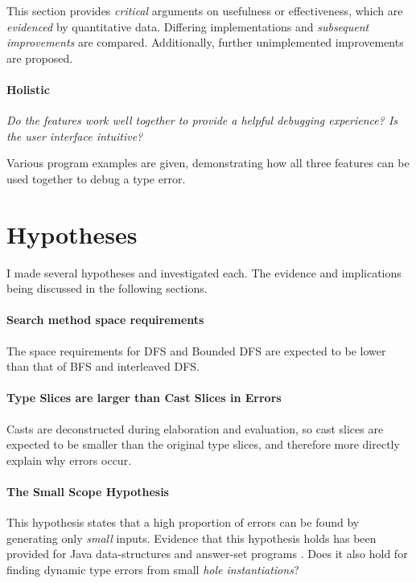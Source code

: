 This section provides \textit{critical} arguments on {usefulness} or {effectiveness}, which are \textit{evidenced} by quantitative data. Differing implementations and \textit{subsequent improvements} are compared. Additionally, further unimplemented improvements are proposed.

\paragraph{Holistic} \textit{Do the features work well together to provide a helpful debugging experience? Is the user interface intuitive?}

Various program examples are given, demonstrating how all three features can be used together to debug a type error.



\section{Hypotheses}
I made several hypotheses and investigated each. The evidence and implications being discussed in the following sections.

\paragraph{Search method space requirements} The space requirements for DFS and Bounded DFS are expected to be lower than that of BFS and interleaved DFS.

\paragraph{Type Slices are larger than Cast Slices in Errors} Casts are deconstructed during elaboration and evaluation, so cast slices are expected to be smaller than the original type slices, and therefore more directly explain why errors occur. 

\paragraph{The Small Scope Hypothesis}
\label{sec:SmallScopeHypothesis} This hypothesis \cite{SmallScopeHypothesisOrigination} states that a high proportion of errors can be found by generating only \textit{small} inputs. Evidence that this hypothesis holds has been provided for Java data-structures \cite{SmallScopeHypothesis} and answer-set programs \cite{SmallScopeHypothesisAnswerSet}. Does it also hold for finding dynamic type errors from small \textit{hole instantiations}?

